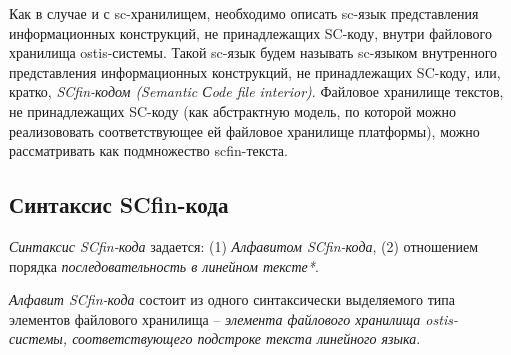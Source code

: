 Как в случае и с sc-хранилищем, необходимо описать sc-язык представления информационных конструкций, не принадлежащих SC-коду, внутри файлового хранилища ostis-системы. Такой sc-язык будем называть sc-языком внутренного представления информационных конструкций, не принадлежащих SC-коду, или, кратко, \textit{SCfin-кодом (Semantic Сode file interior)}. Файловое хранилище текстов, не принадлежащих SC-коду (как абстрактную модель, по которой можно реализововать соответствующее ей файловое хранилище платформы), можно рассматривать как подмножество scfin-текста.

\begin{SCn}
\begin{scnindent}
\end{scnindent}
\end{SCn}

\subsection{Синтаксис SCfin-кода}
\label{sec_soft_platform_scfin_code_alphabet_and_syntax}

\textit{Синтаксис SCfin-кода} задается: (1) \textit{Алфавитом SCfin-кода}, (2) отношением порядка \textit{последовательность в линейном тексте*}.

\begin{SCn}
\begin{scneqtoset}
\end{scneqtoset}
\end{SCn}

\textit{Алфавит SCfin-кода\scnsupergroupsign} состоит из одного синтаксически выделяемого типа элементов файлового хранилища -- \textit{элемента файлового хранилища ostis-системы, соответствующего подстроке текста линейного языка}.

